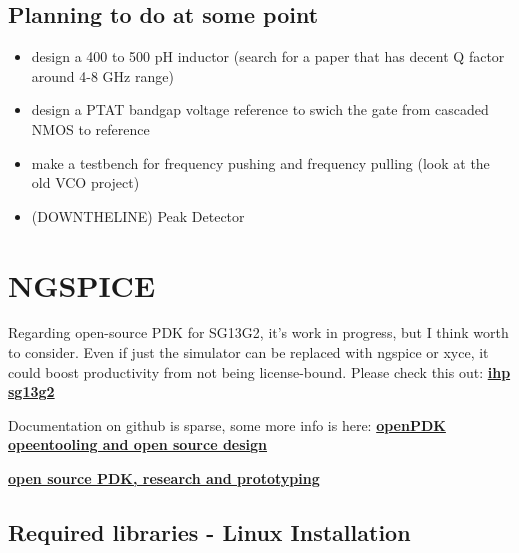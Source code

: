 \documentclass{article}
\begin{document}
\subsection*{Planning to do at some point}

\begin{itemize}
	\item design a 400 to 500 \unit{pH} inductor (search for a paper that has decent Q factor around 4-8 GHz range) %
	\item design a PTAT bandgap voltage reference to swich the gate from cascaded NMOS to reference
	\item make a testbench for frequency pushing and frequency pulling (look at the old VCO project)
	\item (DOWNTHELINE) Peak Detector
\end{itemize}




\section{NGSPICE}

Regarding open-source PDK for SG13G2, it's work in progress, but
I think worth to consider. Even if just the simulator can be replaced
with ngspice or xyce, it could boost productivity from not being license-bound.
Please check this out:
\href{https://github.com/IHP-GmbH/IHP-Open-PDK/tree/main/ihp-sg13g2}{\textbf{ihp sg13g2}}

Documentation on github is sparse, some more info is here:
\href{https://www.ihp-microelectronics.com/events-1/detail/openpdk-opentooling-and-open-source-design-an-initiative-to-push-development}{\textbf{openPDK opeentooling and open source design}}

\href{https://www.ihp-microelectronics.com/services/research-and-prototyping-service/fast-design-enablement/open-source-pdk}{\textbf{open source PDK, research and prototyping}}



\subsection{Required libraries - Linux Installation}
\end{document}
